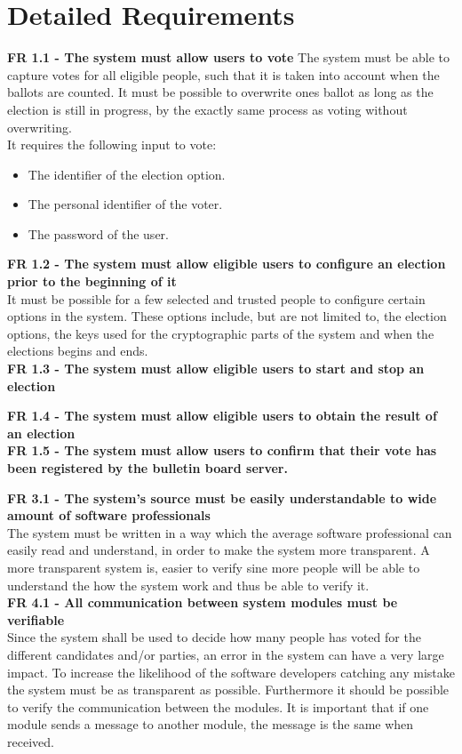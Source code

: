 \begin{tabular}{| l | l |}
\end{tabular}

\section{Detailed Requirements}

\textbf{FR 1.1 - The system must allow users to vote} \bigskip 
The system must be able to capture votes for all eligible people, such that it is taken into account when the ballots are counted. It must be possible to overwrite ones ballot as long as the election is still in progress, by the exactly same process as voting without overwriting.\\
It requires the following input to vote:
\begin{itemize}
\item The identifier of the election option.
\item The personal identifier of the voter.
\item The password of the user.
\end{itemize}
\bigskip 
\textbf{FR 1.2 - The system must allow eligible users to configure an election prior to the beginning of it} \\
It must be possible for a few selected and trusted people to configure certain options in the system. These options include, but are not limited to, the election options, the keys used for the cryptographic parts of the system and when the elections begins and ends. \\
\textbf{FR 1.3 - The system must allow eligible users to start and stop an election}

\textbf{FR 1.4 - The system must allow eligible users to obtain the result of an election} \\

\textbf{FR 1.5 - The system must allow users to confirm that their vote has been registered by the bulletin board server.}

\textbf{FR 3.1 - The system's source must be easily understandable to wide amount of software professionals} \\
The system must be written in a way which the average software professional can easily read and understand, in order to make the system more transparent. A more transparent system is, easier to verify sine more people will be able to understand the how the system work and thus be able to verify it. \\


\textbf{FR 4.1 - All communication between system modules must be verifiable} \\
Since the system shall be used to decide how many people has voted for the different candidates and/or parties, an error in the system can have a very large impact. To increase the likelihood of the software developers catching any mistake the system must be as transparent as possible. Furthermore it should be possible to verify the communication between the modules. It is important that if one module sends a message to another module, the message is the same when received.